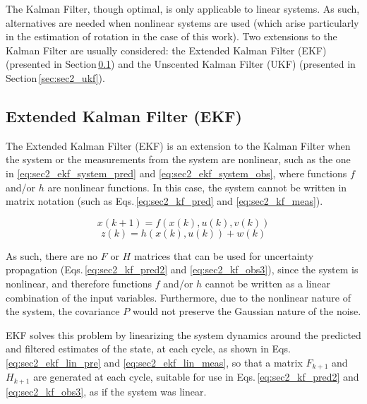 The Kalman Filter, though optimal, is only applicable to linear systems. As such, alternatives are needed when nonlinear systems are used (which arise particularly in the estimation of rotation in the case of this work). Two extensions to the Kalman Filter are usually considered: the Extended Kalman Filter (EKF) (presented in Section\,\ref{sec:sec2_ekf}) and the Unscented Kalman Filter (UKF) (presented in  Section\,\ref{sec:sec2_ukf}).

\subsection{Extended Kalman Filter (EKF)}
\label{sec:sec2_ekf}

The Extended Kalman Filter (EKF) is an extension to the Kalman Filter when the system or the measurements from the system are nonlinear, such as the one in \eqref{eq:sec2_ekf_system_pred} and \eqref{eq:sec2_ekf_system_obs}, where functions $f$ and/or $h$ are nonlinear functions. In this case, the system cannot be written in matrix notation (such as Eqs.\,\eqref{eq:sec2_kf_pred} and \eqref{eq:sec2_kf_meas}).%

\begin{equation}
    \label{eq:sec2_ekf_system_pred}
    x(k+1) = f(x(k),u(k),v(k))
\end{equation}
\begin{equation}
    \label{eq:sec2_ekf_system_obs}
    z(k)=h(x(k), u(k)) + w(k)
\end{equation}

 As such, there are no $F$ or $H$ matrices that can be used for uncertainty propagation (Eqs.\,\eqref{eq:sec2_kf_pred2} and \eqref{eq:sec2_kf_obs3}), since the system is nonlinear, and therefore functions $f$ and/or $h$ cannot be written as a linear combination of the input variables. Furthermore, due to the nonlinear nature of the system, the covariance $P$ would not preserve the Gaussian nature of the noise.

 EKF solves this problem by linearizing the system dynamics around the predicted and filtered estimates of the state, at each cycle, as shown in Eqs.\,\eqref{eq:sec2_ekf_lin_pre} and \eqref{eq:sec2_ekf_lin_meas}, so that a matrix $F_{k+1}$ and $H_{k+1}$ are generated at each cycle, suitable for use in Eqs.\,\eqref{eq:sec2_kf_pred2} and \eqref{eq:sec2_kf_obs3}, as if the system was linear.

